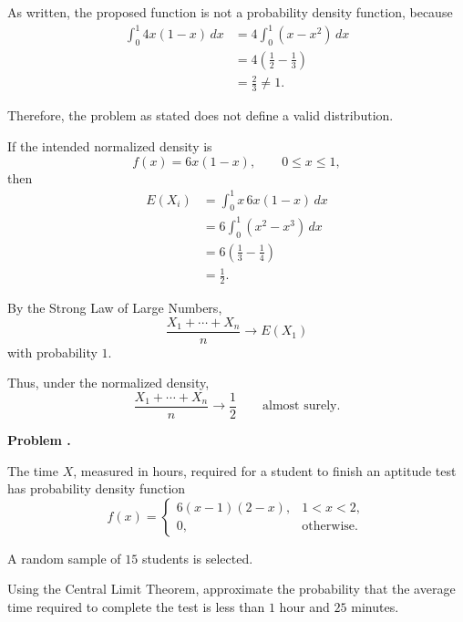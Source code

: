\documentclass[11pt]{article}
\newcounter{problem}
\newenvironment{problem}[1][]{
    \refstepcounter{problem}
    \begin{problemheader}
        \textbf{Problem \theproblem%
        \if\relax\detokenize{#1}\relax
        \else. #1%
        \fi}
    \end{problemheader}
}{
    \vspace{0.5em}
}
\newenvironment{solution}{
    \par
    \begin{tcolorbox}[
        colback=white,
        colframe=uwgold,
        boxrule=0.7pt,
        arc=2mm,
        left=3mm,
        right=3mm,
        top=2mm,
        bottom=2mm,
        breakable,
        before skip=0.5em,
        after skip=1em,
        title=\textbf{Solution},
        coltitle=uwpurple,
        fonttitle=\bfseries
    ]
}{
    \end{tcolorbox}
}
\begin{document}
\begin{solution}

As written, the proposed function is not a probability density function,
because
\[
\begin{aligned}
\int_0^1 4x(1-x)\,dx
&=
4\int_0^1(x-x^2)\,dx\\
&=
4\left(
\frac12-\frac13
\right)\\
&=
\frac23
\neq1.
\end{aligned}
\]

Therefore, the problem as stated does not define a valid distribution.

If the intended normalized density is
\[
f(x)=6x(1-x),
\qquad
0\leq x\leq1,
\]
then
\[
\begin{aligned}
E(X_i)
&=
\int_0^1
x\,6x(1-x)\,dx\\
&=
6\int_0^1(x^2-x^3)\,dx\\
&=
6\left(
\frac13-\frac14
\right)\\
&=
\frac12.
\end{aligned}
\]

By the Strong Law of Large Numbers,
\[
\frac{X_1+\cdots+X_n}{n}
\longrightarrow
E(X_1)
\]
with probability \(1\).

Thus, under the normalized density,
\[
\frac{X_1+\cdots+X_n}{n}
\longrightarrow
\frac12
\qquad
\text{almost surely}.
\]

\end{solution}



\newpage
\begin{problem}

The time \(X\), measured in hours, required for a student to finish an
aptitude test has probability density function
\[
f(x)
=
\begin{cases}
6(x-1)(2-x),
&
1<x<2,\\
0,
&
\text{otherwise}.
\end{cases}
\]

A random sample of \(15\) students is selected.

Using the Central Limit Theorem, approximate the probability that the average
time required to complete the test is less than \(1\) hour and \(25\)
minutes.

\end{problem}
\end{document}
